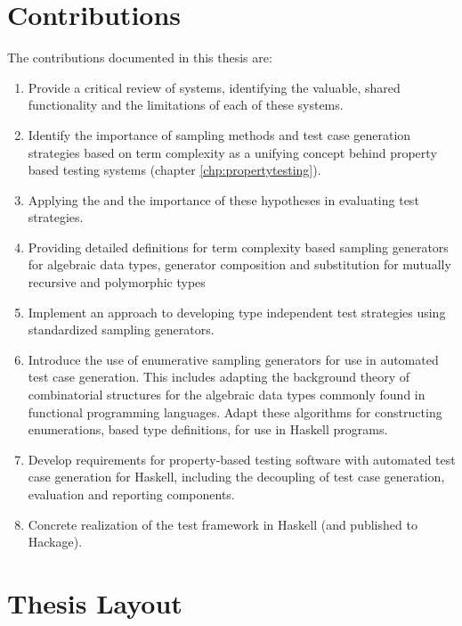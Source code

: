 \section{ Contributions }

The contributions documented in this thesis are:

\begin{enumerate}

\item {Provide a critical review of \pbt systems,
identifying the valuable, shared functionality and 
the limitations of each of these systems. 
}
\item { Identify the importance of sampling methods and 
test case generation strategies based on term complexity as
a unifying concept behind property based testing systems
(chapter \ref{chp:propertytesting}). 
}
\item{Applying the 
and the importance of these hypotheses in evaluating test strategies. 
}
\item{ Providing detailed definitions for
term complexity based sampling generators for algebraic data types,
generator composition and substitution for mutually recursive and polymorphic types
}
\item { Implement an approach to developing
type independent test strategies
using standardized sampling generators. 
}
\item{ Introduce the use of enumerative sampling generators for
use in automated test case generation.
This includes adapting the background theory of combinatorial structures
for the algebraic data types commonly found in functional programming languages.
Adapt these algorithms for constructing enumerations,
based type definitions, for use in Haskell programs. 
}
\item{ Develop requirements for property-based testing software
with automated test case generation for Haskell,
including the decoupling of test case generation, evaluation and reporting components. 
}
\item{ Concrete realization of the \GC test framework in Haskell (and published to Hackage).
}
\end{enumerate}


\section{Thesis Layout}

